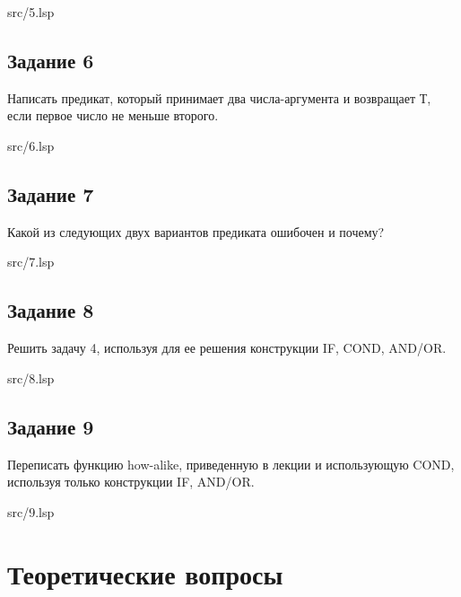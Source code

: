 \FloatBarrier
\begin{lstinputlisting}[style={lsp}]{src/5.lsp}
\end{lstinputlisting}
\FloatBarrier

\section*{Задание 6}
Написать предикат, который принимает два числа-аргумента и возвращает
Т, если первое число не меньше второго.

\FloatBarrier
\begin{lstinputlisting}[style={lsp}]{src/6.lsp}
\end{lstinputlisting}
\FloatBarrier

\clearpage

\section*{Задание 7}
Какой из следующих двух вариантов предиката ошибочен и почему?

\FloatBarrier
\begin{lstinputlisting}[style={lsp}]{src/7.lsp}
\end{lstinputlisting}
\FloatBarrier


\section*{Задание 8}
Решить задачу 4, используя для ее решения конструкции
IF, COND, AND/OR.

\FloatBarrier
\begin{lstinputlisting}[style={lsp}]{src/8.lsp}
\end{lstinputlisting}
\FloatBarrier

\clearpage

\section*{Задание 9}
Переписать функцию how-alike, приведенную в лекции и использующую COND, используя
только конструкции IF, AND/OR.

\FloatBarrier
\begin{lstinputlisting}[style={lsp}]{src/9.lsp}
\end{lstinputlisting}
\FloatBarrier


\chapter*{Теоретические вопросы}

